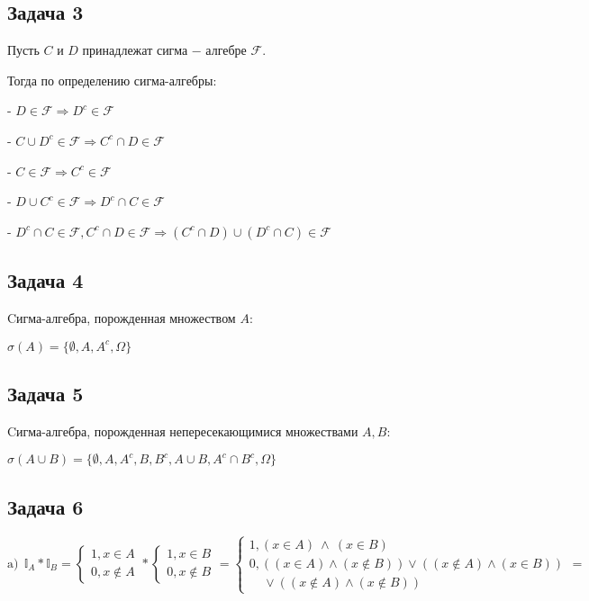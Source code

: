 \documentclass[a4paper,12pt]{article} %
\begin{document}
\subsection*{Задача 3}

Пусть  $C$ и $D$ принадлежат сигма − алгебре $\mathcal{F}$.

Тогда по определению сигма-алгебры:

- $D \in \mathcal{F} \Rightarrow D^c \in \mathcal{F}$

- $C \cup D^c   \in \mathcal{F} \Rightarrow    C^c \cap D  \in \mathcal{F} $

- $C \in \mathcal{F} \Rightarrow C^c \in \mathcal{F}$

- $D \cup C^c   \in \mathcal{F} \Rightarrow    D^c \cap C  \in \mathcal{F} $

- $ D^c \cap C  \in \mathcal{F},  C^c \cap D  \in \mathcal{F} \Rightarrow (C^c \cap D) \cup (D^c \cap C)  \in \mathcal{F}$

\subsection*{Задача 4}

Cигма-алгебра, порожденная множеством $A$:

$\sigma(A) = \{\emptyset, A, A^c, \Omega  \}$

\subsection*{Задача 5}

Cигма-алгебра, порожденная непересекающимися множествами $A, B$:


$\sigma(A \cup B) = \{\emptyset, A, A^c, B, B^c, A \cup B, A^c \cap B^c, \Omega  \}$


\subsection*{Задача 6}

\begin{equation}\label{key}
\text{a)}  \ \   \mathbb{I}_{A} * \mathbb{I}_{B} =  \begin{cases} 1,  x \in A  \\0,  x \notin A   
\end{cases}  * \begin{cases} 1,  x \in B \\0,  x \notin B   
\end{cases}  = \begin{cases} 1,  (x \in A) \  \wedge \  (x \in  B)  \\ 0, ((x \in A)  \wedge  (x \notin B )  ) \vee ((x \notin A)  \wedge  (x \in B )  ) \\ \ \ \ \ \ \vee ((x \notin A)  \wedge  (x \notin B )  )
\end{cases} = 
\end{equation}
\end{document}
